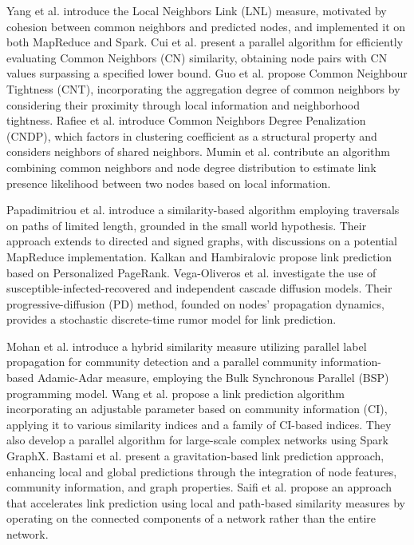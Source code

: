 Yang et al. \cite{yang2015new} introduce the Local Neighbors Link (LNL) measure, motivated by cohesion between common neighbors and predicted nodes, and implemented it on both MapReduce and Spark. Cui et al. \cite{cui2016bounded} present a parallel algorithm for efficiently evaluating Common Neighbors (CN) similarity, obtaining node pairs with CN values surpassing a specified lower bound. Guo et al. \cite{guo2019node} propose Common Neighbour Tightness (CNT), incorporating the aggregation degree of common neighbors by considering their proximity through local information and neighborhood tightness. Rafiee et al. \cite{rafiee2020cndp} introduce Common Neighbors Degree Penalization (CNDP), which factors in clustering coefficient as a structural property and considers neighbors of shared neighbors. Mumin et al. \cite{mumin2022efficient} contribute an algorithm combining common neighbors and node degree distribution to estimate link presence likelihood between two nodes based on local information.

Papadimitriou et al. \cite{papadimitriou2012fast} introduce a similarity-based algorithm employing traversals on paths of limited length, grounded in the small world hypothesis. Their approach extends to directed and signed graphs, with discussions on a potential MapReduce implementation. Kalkan and Hambiralovic \cite{kalkanfinding} propose link prediction based on Personalized PageRank. Vega-Oliveros et al. \cite{vega2021link} investigate the use of susceptible-infected-recovered and independent cascade diffusion models. Their progressive-diffusion (PD) method, founded on nodes' propagation dynamics, provides a stochastic discrete-time rumor model for link prediction.

Mohan et al. \cite{mohan2017scalable} introduce a hybrid similarity measure utilizing parallel label propagation for community detection and a parallel community information-based Adamic-Adar measure, employing the Bulk Synchronous Parallel (BSP) programming model. Wang et al. \cite{wang2019link} propose a link prediction algorithm incorporating an adjustable parameter based on community information (CI), applying it to various similarity indices and a family of CI-based indices. They also develop a parallel algorithm for large-scale complex networks using Spark GraphX. Bastami et al. \cite{bastami2019gravitation} present a gravitation-based link prediction approach, enhancing local and global predictions through the integration of node features, community information, and graph properties. Saifi et al. \cite{saifi2023fast} propose an approach that accelerates link prediction using local and path-based similarity measures by operating on the connected components of a network rather than the entire network.

